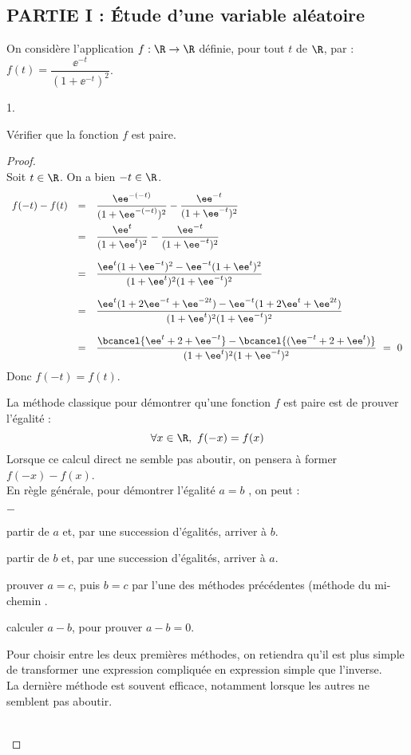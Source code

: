 \documentclass[11pt]{article}%
\begin{document}
\subsection*{PARTIE I : Étude d'une variable aléatoire}

\noindent
On considère l'application $f:\R\rightarrow\R$ définie, 
pour tout $t$ de $\R$, par : 
$f(t)=\dfrac{\ee^{-t}}{(1+\ee^{-t})^2}$.

\begin{noliste}{1.}
\setlength{\itemsep}{2mm}
\item Vérifier que la fonction $f$ est paire.

\begin{proof}~\\
 Soit $t\in\R$. On a bien $-t\in\R$.
 \[
  \begin{array}{rcl}
    f(-t) - f(t) & = & \dfrac{\ee^{-(-t)}}{(1+\ee^{-(-t)})^2}
    - \dfrac{\ee^{-t}}{(1+\ee^{-t})^2}
    \\[.4cm]
    & = & \dfrac{\ee^t}{(1+\ee^t)^2} - \dfrac{\ee^{-t}}{(1+\ee^{-t})^2}
    \\[.6cm]
    & = & \dfrac{\ee^t(1+\ee^{-t})^2-\ee^{-t}(1+\ee^t)^2}
    {(1+\ee^t)^2 (1+\ee^{-t})^2}
    \\[.6cm]
    & = & \dfrac{\ee^t(1+2\ee^{-t}+\ee^{-2t}) 
    - \ee^{-t}(1+2\ee^t+\ee^{2t})}
    {(1+\ee^t)^2 (1+\ee^{-t})^2}
    \\[.6cm]
    & = & \dfrac{\bcancel{\ee^t +2+\ee^{-t}} - \bcancel{(\ee^{-t}
    +2+\ee^t)}}{(1+\ee^t)^2 (1+\ee^{-t})^2} \ = \ 0
  \end{array}
 \]
 Donc $f(-t)=f(t)$.
 
 \begin{remark}%
  La méthode classique pour démontrer qu'une fonction $f$ est paire
  est de prouver l'égalité :
  \[
   \forall x \in \R, \ f(-x)=f(x)
  \]
  Lorsque ce calcul direct ne semble pas aboutir, on pensera à 
  former $f(-x)-f(x)$.\\[.2cm]
  En règle générale, pour démontrer l'égalité \og $a=b$ \fg{}, on peut :
  \begin{noliste}{$-$}
   \item partir de $a$ et, par une succession d'égalités, arriver à $b$.
   \item partir de $b$ et, par une succession d'égalités, arriver à $a$.
   \item prouver $a=c$, puis $b=c$ par l'une des méthodes précédentes 
   (méthode du \og mi-chemin \fg{}.
   \item calculer $a-b$, pour prouver $a-b=0$.
  \end{noliste}
  Pour choisir entre les deux premières méthodes, on retiendra qu'il 
est plus simple de transformer une expression \og compliquée \fg{} en 
expression \og simple \fg{} que l'inverse.\\
La dernière méthode est souvent efficace, notamment lorsque les autres 
ne semblent pas aboutir.
 \end{remark}~\\[-1.2cm]
\end{proof}




\end{noliste}
\end{document}
